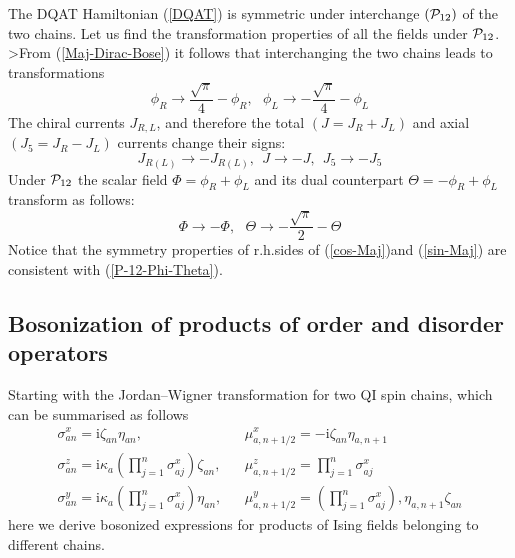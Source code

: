 The DQAT Hamiltonian (\ref{DQAT}) is symmetric under interchange
$({\cal{P}}_{12})$ of the two chains. Let us find the transformation properties
of
all the fields under ${\cal{P}}_{12}$.
>From (\ref{Maj-Dirac-Bose}) it follows that interchanging the two chains
leads to transformations
\begin{equation}
\phi_R \rightarrow \frac{\sqrt{\pi}}{4} - \phi_R, ~~~
\phi_L \rightarrow - \frac{\sqrt{\pi}}{4} - \phi_L
\label{P-12-phi-RL}
\end{equation}
The chiral currents $J_{R,L}$, and therefore the total $(J = J_{R} + J_{L})$
and axial $(J_5 = J_{R} - J_{L})$ currents change their signs:
\begin{equation}
J_{R(L)} \rightarrow - J_{R(L)}, ~~
J \rightarrow - J, ~~J_5 \rightarrow - J_5
\label{P-12-curr}
\end{equation}
Under ${\cal{P}}_{12}$ the scalar field $\Phi = \phi_R + \phi_L$ and its dual
counterpart
$\Theta = - \phi_R + \phi_L$ transform as follows: 
\begin{equation}
\Phi \rightarrow - \Phi, ~~~\Theta \rightarrow - \frac{\sqrt{\pi}}{2} - \Theta
\label{P-12-Phi-Theta}
\end{equation}
Notice that the symmetry properties of r.h.sides of (\ref{cos-Maj})and
(\ref{sin-Maj}) are consistent with (\ref{P-12-Phi-Theta}).

\subsection{Bosonization of products of order and disorder operators}

Starting with the Jordan--Wigner transformation for two QI spin chains,
which can be summarised as follows
\begin{eqnarray}
\sigma^x _{an} = \mbox{i} \zeta _{an} \eta_{an}, &&
\mu^x _{a,n+1/2} = - \mbox{i} \zeta_{an} \eta_{a,n+1} \label{a1}\\
\sigma^z _{an} = \mbox{i} \kappa_a \left( \prod_{j=1}^{n} \sigma^x _{aj} \right) \zeta_{an},
&&
\mu^z _{a,n+1/2} = \prod_{j=1}^{n}\sigma^x _{aj} \label{b1}\\
\sigma^y _{an} = \mbox{i} \kappa_a \left( \prod_{j=1}^{n} \sigma^x _{aj} \right)\eta_{an},
&&
\mu^y _{a,n+1/2} = \left( \prod_{j=1}^{n}\sigma^x _{aj} \right),
\eta_{a,n+1} \zeta_{an} \label{c1}
\end{eqnarray}
here we derive bosonized expressions for products of Ising fields belonging to
different chains.

\medskip

